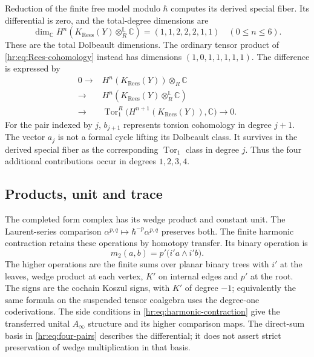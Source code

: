 Reduction of the finite free model modulo $\hbar$
computes its derived special fiber. Its differential
is zero, and the total-degree dimensions are
\begin{equation}\label{hr:eq:derived-dimensions}
 \dim_{\mathbb C}
 H^n\!\left(K_{\mathrm{Rees}}(Y)\otimes_R^{\mathbb L}\mathbb C\right)
       =(1,1,2,2,2,1,1)\quad(0\le n\le6).
\end{equation}
These are the total Dolbeault dimensions.
The ordinary tensor product of
\eqref{hr:eq:Rees-cohomology} instead has dimensions
$(1,0,1,1,1,1,1)$.
The difference is expressed by
\begin{equation}\label{hr:eq:derived-Tor}
 \begin{split}
 0\longrightarrow&
 H^n(K_{\mathrm{Rees}}(Y))\otimes_R\mathbb C\\
 \longrightarrow&
 H^n\!\left(K_{\mathrm{Rees}}(Y)
                    \otimes_R^{\mathbb L}\mathbb C\right)\\
 \longrightarrow&
 \operatorname{Tor}_1^R
       \bigl(H^{n+1}(K_{\mathrm{Rees}}(Y)),\mathbb C\bigr)
 \longrightarrow0.
 \end{split}
\end{equation}
For the pair indexed by $j$, $b_{j+1}$ represents
torsion cohomology in degree $j+1$. The vector $a_j$
is not a formal cycle lifting its Dolbeault class.
It survives in the derived special fiber as the
corresponding $\operatorname{Tor}_1$ class in degree
$j$. Thus the four additional contributions occur
in degrees $1,2,3,4$.

\subsection{Products, unit and trace}

The completed form complex has its wedge product and
constant unit. The Laurent-series comparison
$\alpha^{p,q}\mapsto\hbar^{-p}\alpha^{p,q}$ preserves
both. The finite harmonic contraction retains these
operations by homotopy transfer. Its binary operation is
\[
 m_2(a,b)=p'\bigl(i'a\wedge i'b\bigr).
\]
The higher operations are the finite sums over planar
binary trees with $i'$ at the leaves, wedge product
at each vertex, $K'$ on internal edges and $p'$ at
the root. The signs are the cochain Koszul signs,
with $K'$ of degree $-1$; equivalently the same
formula on the suspended tensor coalgebra uses the
degree-one coderivations. The side conditions in
\eqref{hr:eq:harmonic-contraction} give the transferred
unital $A_\infty$ structure and its higher comparison
maps. The direct-sum basis in
\eqref{hr:eq:four-pairs} describes the differential;
it does not assert strict preservation of wedge
multiplication in that basis.

